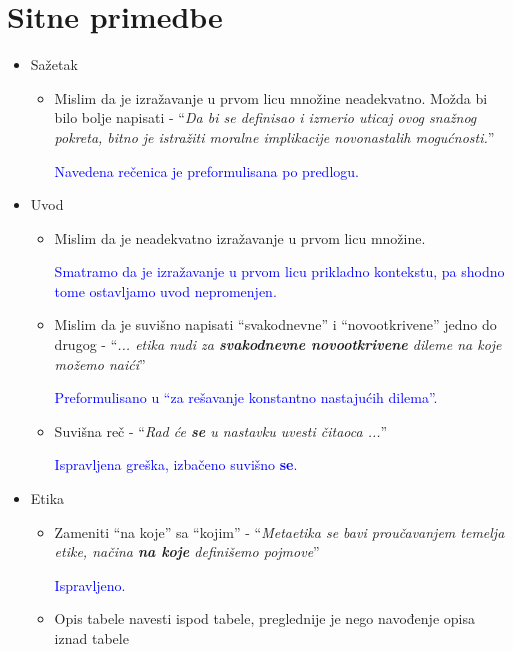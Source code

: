 \documentclass[a4paper]{report}
\newcommand{\odgovor}[1]{\textcolor{blue}{#1}}
\begin{document}
\section{Sitne primedbe}
\begin{itemize}
    \item Sažetak
    \begin{itemize}
        \item Mislim da je izražavanje u prvom licu množine neadekvatno. Možda bi bilo bolje napisati - ``\textit{Da bi se definisao i izmerio uticaj ovog snažnog pokreta, bitno je istražiti moralne implikacije novonastalih mogućnosti.}''
        
        \odgovor{Navedena rečenica je preformulisana po predlogu. }
        
    \end{itemize}
    \item Uvod
    \begin{itemize}
        \item Mislim da je neadekvatno izražavanje u prvom licu množine.
        
        \odgovor{Smatramo da je izražavanje u prvom licu prikladno kontekstu, pa shodno tome ostavljamo uvod nepromenjen. }
        
        \item Mislim da je suvišno napisati ``svakodnevne'' i ``novootkrivene'' jedno do drugog - ``\textit{... etika nudi za \textbf{svakodnevne novootkrivene} dileme na koje možemo naići}''

        \odgovor{Preformulisano u ``za rešavanje konstantno nastajućih dilema''.}
                
        \item Suvišna reč - ``\textit{Rad će \textbf{se} u nastavku uvesti čitaoca ...}''
        
        \odgovor{Ispravljena greška, izbačeno suvišno \textbf{se}.}
        
    \end{itemize}
    \item Etika
    \begin{itemize}
        \item Zameniti ``na koje'' sa ``kojim'' - ``\textit{Metaetika se bavi proučavanjem temelja etike, načina \textbf{na koje} definišemo pojmove}''
        
        \odgovor{Ispravljeno.}
        
        \item Opis tabele navesti ispod tabele, preglednije je nego navođenje opisa iznad tabele
        

\end{itemize}
\end{itemize}
\end{document}
